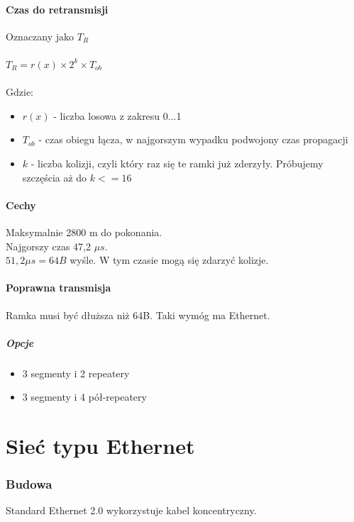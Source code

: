 \documentclass[a4paper,twoside]{article}
\begin{document}
\subsection{Czas do retransmisji}
Oznaczany jako $ T_{R} $\\\\
$ T_{R} = r(x)\times 2^{k}\times T_{ob}$\\\\Gdzie:\\
\begin{itemize}
	\item $ r(x) $ - liczba losowa z zakresu 0...1
	\item $ T_{ob} $ - czas obiegu łącza, w najgorszym wypadku podwojony czas propagacji
	\item $ k $ - liczba kolizji, czyli który raz się te ramki już zderzyły. Próbujemy szczęścia aż do $ k <=16 $
\end{itemize}
\subsection{Cechy}
Maksymalnie 2800 m do pokonania.\\
Najgorszy czas 47,2 $ \mu s $.\\
$ 51,2 \mu s=64B $ wyśle. W tym czasie mogą się zdarzyć kolizje.
\subsection{Poprawna transmisja}
Ramka musi być dłuższa niż 64B. Taki wymóg ma Ethernet.
\subsubsection{Opcje}
\begin{itemize}
	\item 3 segmenty i 2 repeatery
	\item 3 segmenty i 4 pół-repeatery
\end{itemize}


\part{Sieć typu Ethernet}
\section{Budowa}
	Standard Ethernet 2.0 wykorzystuje kabel koncentryczny.
\end{document}
